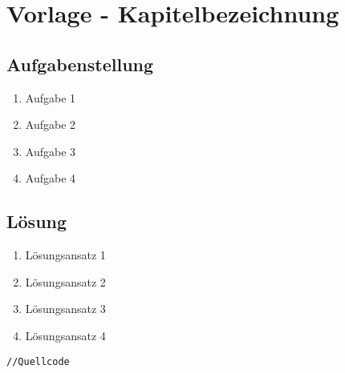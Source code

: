 \section{Vorlage - Kapitelbezeichnung}
\subsection{Aufgabenstellung}

\begin{enumerate}%
		\item Aufgabe 1
		\item Aufgabe 2
		\item Aufgabe 3
		\item Aufgabe 4
		
\end{enumerate}

\subsection{Lösung}
\begin{enumerate}
		\item Lösungsansatz 1
		\item Lösungsansatz 2
		\item Lösungsansatz 3
		\item Lösungsansatz 4
\end{enumerate}


\begin{lstlisting}[frame=htrbl, caption={Listening Bezeichnung}, label={lst:Referenzname}]
//Quellcode
\end{lstlisting}

